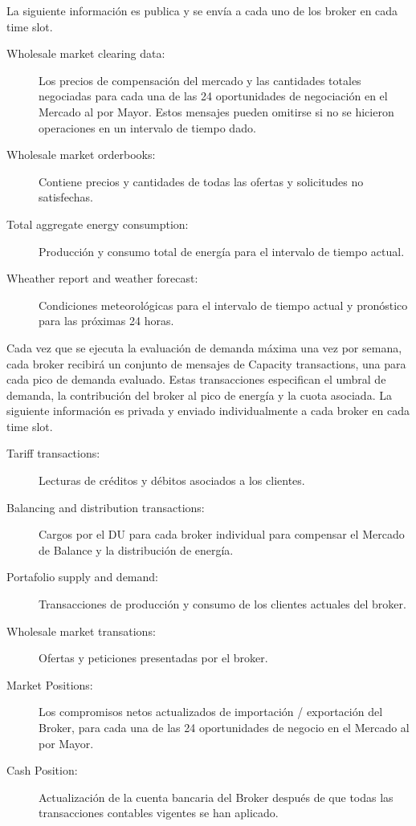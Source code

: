La siguiente información es publica y se envía a cada uno de los broker en cada time slot.
\begin{description}
	\item [Wholesale market clearing data: ]Los precios de compensación del mercado y las cantidades totales negociadas para cada una de las 24 oportunidades de negociación en el Mercado al por Mayor. Estos mensajes pueden omitirse si no se hicieron operaciones en un intervalo de tiempo dado.
	\item [Wholesale market orderbooks: ]Contiene precios y cantidades de todas las ofertas y solicitudes no satisfechas.
	\item [Total aggregate energy consumption: ]Producción y consumo total de energía para el intervalo de tiempo actual.
	\item [Wheather report and weather forecast:] Condiciones meteorológicas para el intervalo de tiempo actual y pronóstico para las próximas 24 horas.
\end{description}
Cada vez que se ejecuta la evaluación de demanda máxima una vez por semana, cada broker recibirá un conjunto de mensajes de Capacity transactions, una para cada pico de demanda evaluado. Estas transacciones especifican el umbral de demanda, la contribución del broker al pico de energía y la cuota asociada. La siguiente información es privada y enviado individualmente a cada broker en cada time slot.
\begin{description}
	\item [Tariff transactions:] Lecturas de créditos y débitos asociados a los clientes.
	\item [Balancing and distribution transactions:] Cargos por el DU para cada broker individual para compensar el Mercado de Balance y la distribución de energía.
	\item [Portafolio supply and demand:] Transacciones de producción y consumo de los clientes actuales del broker.
	\item [Wholesale market transations:] Ofertas y peticiones presentadas por el broker.
	\item [Market Positions:] Los compromisos netos actualizados de importación / exportación del Broker, para cada una de las 24 oportunidades de negocio en el Mercado al por Mayor.
	\item [Cash Position: ]Actualización de la cuenta bancaria del Broker después de que todas las transacciones contables vigentes se han aplicado.
\end{description}


